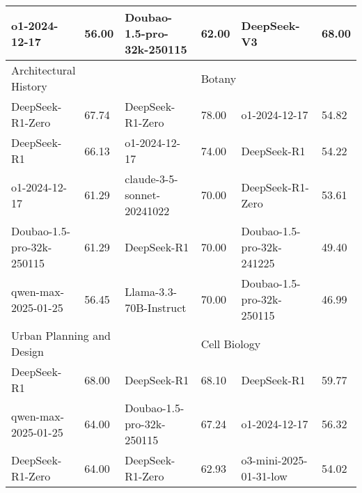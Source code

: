 {\begin{longtable}{p{4.2cm}>{\centering\arraybackslash} p{0.8cm}|p{4.2cm} >{\centering\arraybackslash} p{0.8cm}|p{4.2cm} >{\centering\arraybackslash} p{0.8cm}}
\cellcolor{blue!5} o1-2024-12-17 & \cellcolor{blue!2}56.00 & \cellcolor{red!5} Doubao-1.5-pro-32k-250115 & \cellcolor{red!2} 62.00 & \cellcolor{green!5} DeepSeek-V3 & \cellcolor{green!2} 68.00\\
\hline
\multicolumn{2}{p{5.15cm}|}{\cellcolor{blue!10} \centering Architectural History} & \multicolumn{2}{p{5.15cm}|}{\cellcolor{red!10} \centering Contract Law} & \multicolumn{2}{p{5.15cm}}{\cellcolor{green!10} \centering Botany}\\
\hline
\cellcolor{blue!5} DeepSeek-R1-Zero & \cellcolor{blue!2}67.74 & \cellcolor{red!5} DeepSeek-R1-Zero & \cellcolor{red!2} 78.00 & \cellcolor{green!5} o1-2024-12-17 & \cellcolor{green!2} 54.82\\
\cellcolor{blue!5} DeepSeek-R1 & \cellcolor{blue!2}66.13 & \cellcolor{red!5} o1-2024-12-17 & \cellcolor{red!2} 74.00 & \cellcolor{green!5} DeepSeek-R1 & \cellcolor{green!2} 54.22\\
\cellcolor{blue!5} o1-2024-12-17 & \cellcolor{blue!2}61.29 & \cellcolor{red!5} claude-3-5-sonnet-20241022 & \cellcolor{red!2} 70.00 & \cellcolor{green!5} DeepSeek-R1-Zero & \cellcolor{green!2} 53.61\\
\cellcolor{blue!5} Doubao-1.5-pro-32k-250115 & \cellcolor{blue!2}61.29 & \cellcolor{red!5} DeepSeek-R1 & \cellcolor{red!2} 70.00 & \cellcolor{green!5} Doubao-1.5-pro-32k-241225 & \cellcolor{green!2} 49.40\\
\cellcolor{blue!5} qwen-max-2025-01-25 & \cellcolor{blue!2}56.45 & \cellcolor{red!5} Llama-3.3-70B-Instruct & \cellcolor{red!2} 70.00 & \cellcolor{green!5} Doubao-1.5-pro-32k-250115 & \cellcolor{green!2} 46.99\\
\hline
\multicolumn{2}{p{5.15cm}|}{\cellcolor{blue!10} \centering Urban Planning and Design} & \multicolumn{2}{p{5.15cm}|}{\cellcolor{red!10} \centering Criminal Law} & \multicolumn{2}{p{5.15cm}}{\cellcolor{green!10} \centering Cell Biology}\\
\hline
\cellcolor{blue!5} DeepSeek-R1 & \cellcolor{blue!2}68.00 & \cellcolor{red!5} DeepSeek-R1 & \cellcolor{red!2} 68.10 & \cellcolor{green!5} DeepSeek-R1 & \cellcolor{green!2} 59.77\\
\cellcolor{blue!5} qwen-max-2025-01-25 & \cellcolor{blue!2}64.00 & \cellcolor{red!5} Doubao-1.5-pro-32k-250115 & \cellcolor{red!2} 67.24 & \cellcolor{green!5} o1-2024-12-17 & \cellcolor{green!2} 56.32\\
\cellcolor{blue!5} DeepSeek-R1-Zero & \cellcolor{blue!2}64.00 & \cellcolor{red!5} DeepSeek-R1-Zero & \cellcolor{red!2} 62.93 & \cellcolor{green!5} o3-mini-2025-01-31-low & \cellcolor{green!2} 54.02\\

\end{longtable}}
